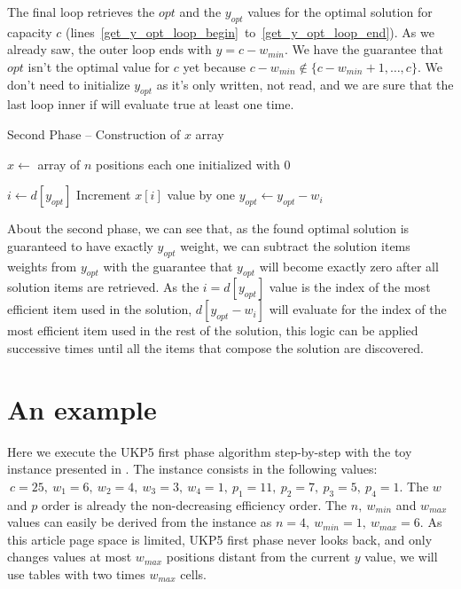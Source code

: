 \documentclass[12pt]{article}
\begin{document}
The final loop retrieves the \(opt\) and the \(y_{opt}\) values for the optimal solution for capacity \(c\) (lines~\ref{get_y_opt_loop_begin}~to~\ref{get_y_opt_loop_end}). As we already saw, the outer loop ends with \(y = c-w_{min}\). We have the guarantee that \(opt\) isn't the optimal value for \(c\) yet because \(c-w_{min} \not\in \{c-w_{min}+1, \ldots, c\}\). We don't need to initialize \(y_{opt}\) as it's only written, not read, and we are sure that the last loop inner if will evaluate true at least one time.

\begin{algorithm}
\caption{Second Phase -- Construction of \(x\) array}\label{alg:ukp5_second_phase}
\begin{algorithmic}[1]
  \State \(x \gets\) array of \(n\) positions each one initialized with \(0\)\label{create_x}
  
    \State \(i \gets d[y_{opt}]\)
    \State Increment \(x[i]\) value by one
    \State \(y_{opt} \gets y_{opt} - w_i\)
  \EndWhile
\EndProcedure
\end{algorithmic}
\end{algorithm}

About the second phase, we can see that, as the found optimal solution is guaranteed to have exactly \(y_{opt}\) weight, we can subtract the solution items weights from \(y_{opt}\) with the guarantee that \(y_{opt}\) will become exactly zero after all solution items are retrieved. As the \(i = d[y_{opt}]\) value is the index of the most efficient item used in the solution, \(d[y_{opt} - w_i]\) will evaluate for the index of the most efficient item used in the rest of the solution, this logic can be applied successive times until all the items that compose the solution are discovered.

\section{An example}

Here we execute the UKP5 first phase algorithm step-by-step with the toy instance presented in \cite{garfinkel}. The instance consists in the following values: \(~c = 25,~w_1 = 6,~w_2 = 4,~w_3 = 3,~w_4 = 1,~p_1 = 11,~p_2 = 7,~p_3 = 5,~p_4 = 1\). The \(w\) and \(p\) order is already the non-decreasing efficiency order. The \(n,~w_{min}\) and \(w_{max}\) values can easily be derived from the instance as \(n = 4,~w_{min} = 1,~w_{max} = 6\). As this article page space is limited, UKP5 first phase never looks back, and only changes values at most \(w_{max}\) positions distant from the current \(y\) value, we will use tables with two times \(w_{max}\) cells.
\end{document}
